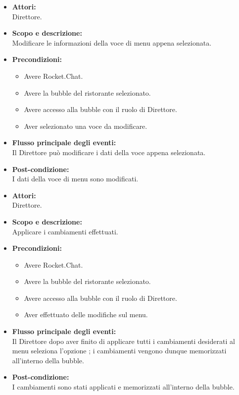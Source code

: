 
\begin{itemize}
	\item \textbf{Attori:}
	\\Direttore.
	\item \textbf{Scopo e descrizione:} 
	\\Modificare le informazioni della voce di menu appena selezionata.
	\item \textbf{Precondizioni:}
	\begin{itemize}
		\item Avere Rocket.Chat.
		\item Avere la bubble del ristorante selezionato.
		\item Avere accesso alla bubble con il ruolo di Direttore.
		\item Aver selezionato una voce da modificare.
	\end{itemize}
	\item \textbf{Flusso principale degli eventi:}
	\\Il Direttore può modificare i dati della voce appena selezionata.
	\item \textbf{Post-condizione:}
	\\I dati della voce di menu sono modificati.
\end{itemize}


\begin{itemize}
	\item \textbf{Attori:}
	\\Direttore.
	\item \textbf{Scopo e descrizione:} 
	\\Applicare i cambiamenti effettuati.
	\item \textbf{Precondizioni:}
	\begin{itemize}
		\item Avere Rocket.Chat.
		\item Avere la bubble del ristorante selezionato.
		\item Avere accesso alla bubble con il ruolo di Direttore.
		\item Aver effettuato delle modifiche sul menu.
	\end{itemize}
	\item \textbf{Flusso principale degli eventi:}
	\\Il Direttore dopo aver finito di applicare tutti i cambiamenti desiderati al menu seleziona l'opzione ; i cambiamenti vengono dunque memorizzati all'interno della bubble.
	\item \textbf{Post-condizione:}
	\\I cambiamenti sono stati applicati e memorizzati all'interno della bubble.
\end{itemize}

